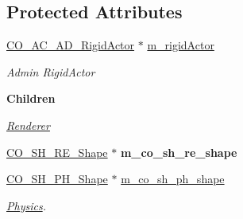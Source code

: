 \subsection*{Protected Attributes}
\begin{DoxyCompactItemize}
\item 
\hypertarget{classContent_1_1Shape_1_1Admin_1_1Shape_af88c6d827853d1b1bbde71ec10020cde}{
\hyperlink{classContent_1_1Actor_1_1Admin_1_1RigidActor}{CO\_\-AC\_\-AD\_\-RigidActor} $\ast$ \hyperlink{classContent_1_1Shape_1_1Admin_1_1Shape_af88c6d827853d1b1bbde71ec10020cde}{m\_\-rigidActor}}
\label{classContent_1_1Shape_1_1Admin_1_1Shape_af88c6d827853d1b1bbde71ec10020cde}

\begin{DoxyCompactList}\small\item\em Admin RigidActor \item\end{DoxyCompactList}\end{DoxyCompactItemize}
\begin{Indent}{\bf Children}\par
{\em \label{_amgrp64e4aca4297806247f62a7b5f8cbd3df}
 \hyperlink{namespaceContent_1_1Shape_1_1Renderer}{Renderer} }\begin{DoxyCompactItemize}
\item 
\hypertarget{classContent_1_1Shape_1_1Admin_1_1Shape_abcad6b88265eb9a15027d31adee98edc}{
\hyperlink{classContent_1_1Shape_1_1Renderer_1_1Shape}{CO\_\-SH\_\-RE\_\-Shape} $\ast$ {\bfseries m\_\-co\_\-sh\_\-re\_\-shape}}
\label{classContent_1_1Shape_1_1Admin_1_1Shape_abcad6b88265eb9a15027d31adee98edc}

\item 
\hypertarget{classContent_1_1Shape_1_1Admin_1_1Shape_ab01a09b10eb594919516a37ec46824ad}{
\hyperlink{classContent_1_1Shape_1_1Physics_1_1Shape}{CO\_\-SH\_\-PH\_\-Shape} $\ast$ \hyperlink{classContent_1_1Shape_1_1Admin_1_1Shape_ab01a09b10eb594919516a37ec46824ad}{m\_\-co\_\-sh\_\-ph\_\-shape}}
\label{classContent_1_1Shape_1_1Admin_1_1Shape_ab01a09b10eb594919516a37ec46824ad}

\begin{DoxyCompactList}\small\item\em \hyperlink{namespaceContent_1_1Shape_1_1Physics}{Physics}. \item\end{DoxyCompactList}\end{DoxyCompactItemize}
\end{Indent}
